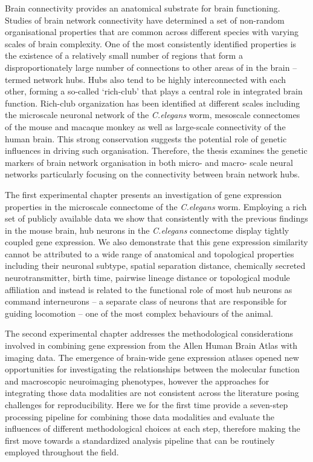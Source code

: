 
\vspace*{20mm}

\vspace{10mm}

Brain connectivity provides an anatomical substrate for brain functioning. Studies of brain network connectivity have determined a set of non-random organisational properties that are common across different species with varying scales of brain complexity. One of the most consistently identified properties is the existence of a relatively small number of regions that form a disproportionately large number of connections to other areas of in the brain -- termed network hubs. Hubs also tend to be highly interconnected with each other, forming a so-called `rich-club’ that plays a central role in integrated brain function. Rich-club organization has been identified at different scales including the microscale neuronal network of the \textit{C.elegans} worm, mesoscale connectomes of the mouse and macaque monkey as well as large-scale connectivity of the human brain. This strong conservation suggests the potential role of genetic influences in driving such organisation. Therefore, the thesis examines the genetic markers of brain network organisation in both micro- and macro- scale neural networks particularly focusing on the connectivity between brain network hubs. 

The first experimental chapter presents an investigation of gene expression properties in the microscale connectome of the \textit{C.elegans} worm. Employing a rich set of publicly available data we show that consistently with the previous findings in the mouse brain, hub neurons in the \textit{C.elegans} connectome display tightly coupled gene expression. We also demonstrate that this gene expression similarity cannot be attributed to a wide range of anatomical and topological properties including their neuronal subtype, spatial separation distance, chemically secreted neurotransmitter, birth time, pairwise lineage distance or topological module affiliation and instead is related to the functional role of most hub neurons as command interneurons -- a separate class of neurons that are responsible for guiding locomotion -- one of the most complex behaviours of the animal. 

The second experimental chapter addresses the methodological considerations involved in combining gene expression from the Allen Human Brain Atlas with imaging data. The emergence of brain-wide gene expression atlases opened new opportunities for investigating the relationships between the molecular function and macroscopic neuroimaging phenotypes, however the approaches for integrating those data modalities are not consistent across the literature posing challenges for reproducibility. Here we for the first time provide a seven-step processing pipeline for combining those data modalities and evaluate the influences of different methodological choices at each step, therefore making the first move towards a standardized analysis pipeline that can be routinely employed throughout the field. 

